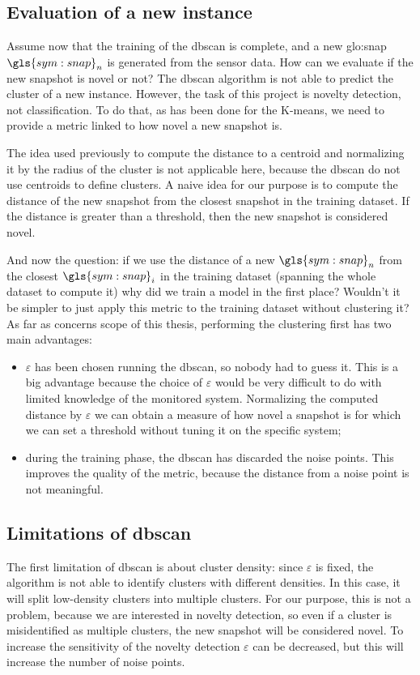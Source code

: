 \subsection{Evaluation of a new instance}
\label{sec:dbscan_eval}
Assume now that the training of the \gls{dbscan} is complete, and a new \gls{glo:snap} $\gls{sym:snap}_n$ is generated from the sensor data. How can we evaluate if the new snapshot is novel or not?
The \gls{dbscan} algorithm is not able to predict the cluster of a new instance. However, the task of this project is novelty detection, not classification.
To do that, as has been done for the K-means, we need to provide a metric linked to how novel a new snapshot is. 

The idea used previously to compute the distance to a centroid and normalizing it by the radius of the cluster is not applicable here, because the \gls{dbscan} do not use centroids to define clusters. A naive idea for our purpose is to compute the distance of the new snapshot from the closest snapshot in the training dataset.
If the distance is greater than a threshold, then the new snapshot is considered novel.

And now the question: if we use the distance of a new $\gls{sym:snap}_n$ from the closest $\gls{sym:snap}_i$ in the training dataset (spanning the whole dataset to compute it) why did we train a model in the first place? Wouldn't it be simpler to just apply this metric to the training dataset without clustering it? As far as concerns scope of this thesis, performing the clustering first has two main advantages:
\begin{itemize}
    \item $\varepsilon$ has been chosen running the \gls{dbscan}, so nobody had to guess it. This is a big advantage because the choice of $\varepsilon$ would be very difficult to do with limited knowledge of the monitored system. Normalizing the computed distance by $\varepsilon$ we can obtain a measure of how novel a snapshot is for which we can set a threshold without tuning it on the specific system;
    \item during the training phase, the \gls{dbscan} has discarded the noise points. This improves the quality of the metric, because the distance from a noise point is not meaningful.
\end{itemize}

\subsection{Limitations of \gls{dbscan}}
The first limitation of \gls{dbscan} is about cluster density: since $\varepsilon$ is fixed, the algorithm is not able to identify clusters with different densities. In this case, it will split low-density clusters into multiple clusters. For our purpose, this is not a problem, because we are interested in novelty detection, so even if a cluster is misidentified as multiple clusters, the new snapshot will be considered novel. To increase the sensitivity of the novelty detection $\varepsilon$ can be decreased, but this will increase the number of noise points.

